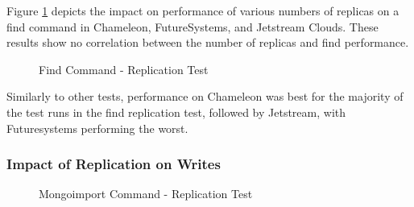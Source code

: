 \documentclass[sigconf]{acmart}
\begin{document}
Figure \ref{fig:replica-find} depicts the impact on performance of
various numbers of replicas on a find command in Chameleon,
FutureSystems, and Jetstream Clouds.  These results show no
correlation between the number of replicas and find performance.

\begin{figure}[htbp]
\centering
{}
\caption{Find Command - Replication Test}
\label{fig:replica-find}
\end{figure}

Similarly to other tests, performance on Chameleon was best for the
majority of the test runs in the find replication test, followed by
Jetstream, with Futuresystems performing the worst.


\subsubsection{Impact of Replication on Writes}


\begin{figure}[htbp]
\centering
{}
\caption{Mongoimport Command - Replication Test}
\label{fig:replica-import}
\end{figure}
\end{document}
